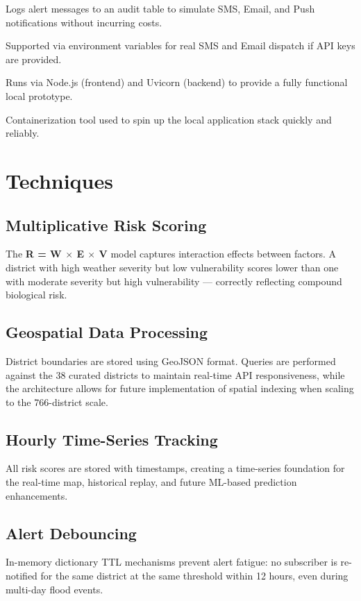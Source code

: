 \documentclass[12pt,a4paper]{report}
\begin{document}
\begin{description}[style=nextline, leftmargin=3cm]
  \item[Mock Dispatcher] Logs alert messages to an audit table to simulate SMS, Email, and Push notifications without incurring costs.
  \item[Twilio / SendGrid (Optional)] Supported via environment variables for real SMS and Email dispatch if API keys are provided.
  \item[Local Environment] Runs via Node.js (frontend) and Uvicorn (backend) to provide a fully functional local prototype.
  \item[Docker Compose] Containerization tool used to spin up the local application stack quickly and reliably.
\end{description}

\section{Techniques}

\subsection{Multiplicative Risk Scoring}
The \textbf{R = W $\times$ E $\times$ V} model captures interaction effects between factors. A district with high weather severity but low vulnerability scores lower than one with moderate severity but high vulnerability --- correctly reflecting compound biological risk.

\subsection{Geospatial Data Processing}
District boundaries are stored using GeoJSON format. Queries are performed against the 38 curated districts to maintain real-time API responsiveness, while the architecture allows for future implementation of spatial indexing when scaling to the 766-district scale.

\subsection{Hourly Time-Series Tracking}
All risk scores are stored with timestamps, creating a time-series foundation for the real-time map, historical replay, and future ML-based prediction enhancements.

\subsection{Alert Debouncing}
In-memory dictionary TTL mechanisms prevent alert fatigue: no subscriber is re-notified for the same district at the same threshold within 12 hours, even during multi-day flood events.
\end{document}
